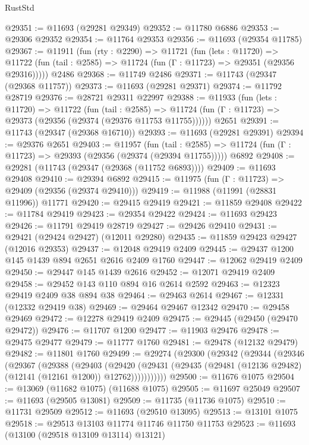 \begin{lexlean}{RustStd}
\begin{coremodule}
@29351 := @11693 (@29281 @29349)
@29352 := @11780 @6886
@29353 := @29306 @29352
@29354 := @11764 @29353
@29356 := @11693 (@29354 @11785)
@29367 := @11911
    (fun (rty : @2290) =>
    @11721
      (fun (lets : @11720) =>
      @11722 (fun (tail : @2585) => @11724 (fun (Γ : @11723) => @29351 (@29356 @29316)))))
    @2486
@29368 := @11749 @2486
@29371 := @11743 (@29347 (@29368 @11757))
@29373 := @11693 (@29281 @29371)
@29374 := @11792 @28719
@29376 := @28721 @29311 @22997
@29388 := @11933
    (fun (lets : @11720) =>
    @11722
      (fun (tail : @2585) =>
      @11724 (fun (Γ : @11723) => @29373 (@29356 (@29374 (@29376 @11753 @11755))))))
    @2651
@29391 := @11743 (@29347 (@29368 @16710))
@29393 := @11693 (@29281 @29391)
@29394 := @29376 @2651
@29403 := @11957
    (fun (tail : @2585) => @11724 (fun (Γ : @11723) => @29393 (@29356 (@29374 (@29394 @11755)))))
    @6892
@29408 := @29281 (@11743 (@29347 (@29368 (@11752 @6893))))
@29409 := @11693 @29408
@29410 := @29394 @6892
@29415 := @11975 (fun (Γ : @11723) => @29409 (@29356 (@29374 @29410)))
@29419 := @11988 (@11991 (@28831 @11996)) @11771
@29420 := @29415 @29419
@29421 := @11859 @29408
@29422 := @11784 @29419
@29423 := @29354 @29422
@29424 := @11693 @29423
@29426 := @11791 @29419 @28719
@29427 := @29426 @29410
@29431 := @29421 (@29424 @29427) (@12011 @29280)
@29435 := @11859 @29423 @29427 (@12016 @29353)
@29437 := @12048 @29419 @2409
@29445 := @29437 @1200 @145 @1439 @894 @2651 @2616 @2409 @1760
@29447 := @12062 @29419 @2409
@29450 := @29447 @145 @1439 @2616
@29452 := @12071 @29419 @2409
@29458 := @29452 @143 @110 @894 @16 @2614 @2592
@29463 := @12323 @29419 @2409 @38 @894 @38
@29464 := @29463 @2614
@29467 := @12331 (@12332 @29419 @38)
@29469 := @29464 @29467 @12342
@29470 := @29458 @29469
@29472 := @12278 @29419 @2409
@29475 := @29445 (@29450 (@29470 @29472))
@29476 := @11707 @1200
@29477 := @11903 @29476
@29478 := @29475 @29477
@29479 := @11777 @1760
@29481 := @29478 (@12132 @29479)
@29482 := @11801 @1760
@29499 := @29274
    (@29300
      (@29342
        (@29344
          (@29346
            (@29367
              (@29388
                (@29403
                  (@29420
                    (@29431
                      (@29435 (@29481 (@12136 @29482) (@12141 (@12161 @1200)) @12762)))))))))))
@29500 := @11676 @1075
@29504 := @13069 (@11682 @1075) (@11688 @1075)
@29505 := @11697 @25049
@29507 := @11693 (@29505 @13081)
@29509 := @11735 (@11736 @1075)
@29510 := @11731 @29509
@29512 := @11693 (@29510 @13095)
@29513 := @13101 @1075
@29518 := @29513 @13103 @11774 @11746 @11750 @11753
@29523 := @11693 (@13100 (@29518 @13109 @13114) @13121)

\end{coremodule}
\end{lexlean}
